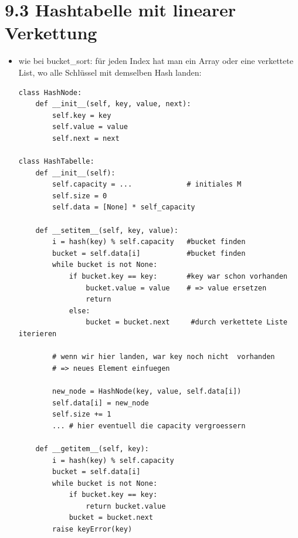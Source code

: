 \documentclass[11pt, fleqn]{scrreprt}
\begin{document}
\section*{9.3 Hashtabelle mit linearer Verkettung}
\begin{itemize}
    \item wie bei bucket\_sort: für jeden Index hat man ein Array oder eine verkettete List, wo alle Schlüssel mit demselben Hash landen:
    \begin{verbatim}
class HashNode:
    def __init__(self, key, value, next):
        self.key = key
        self.value = value
        self.next = next

class HashTabelle:
    def __init__(self):
        self.capacity = ...             # initiales M
        self.size = 0
        self.data = [None] * self_capacity

    def __setitem__(self, key, value):
        i = hash(key) % self.capacity   #bucket finden
        bucket = self.data[i]           #bucket finden
        while bucket is not None:
            if bucket.key == key:       #key war schon vorhanden
                bucket.value = value    # => value ersetzen
                return
            else:
                bucket = bucket.next     #durch verkettete Liste iterieren

        # wenn wir hier landen, war key noch nicht  vorhanden
        # => neues Element einfuegen

        new_node = HashNode(key, value, self.data[i])
        self.data[i] = new_node
        self.size += 1
        ... # hier eventuell die capacity vergroessern

    def __getitem__(self, key):
        i = hash(key) % self.capacity
        bucket = self.data[i]
        while bucket is not None:
            if bucket.key == key:
                return bucket.value
            bucket = bucket.next
        raise keyError(key)
    \end{verbatim}
\end{itemize}
\end{document}
